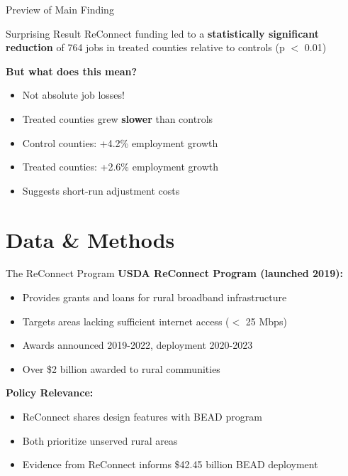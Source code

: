 \documentclass[aspectratio=169]{beamer}
\begin{document}
\begin{frame}{Preview of Main Finding}
\begin{alertblock}{Surprising Result}
ReConnect funding led to a \textbf{statistically significant reduction} of 764 jobs in treated counties relative to controls (p $<$ 0.01)
\end{alertblock}

\vspace{0.5cm}

\textbf{But what does this mean?}
\begin{itemize}
    \item Not absolute job losses!
    \item Treated counties grew \textbf{slower} than controls
    \item Control counties: +4.2\% employment growth
    \item Treated counties: +2.6\% employment growth
    \item Suggests short-run adjustment costs
\end{itemize}
\end{frame}

\section{Data \& Methods}

\begin{frame}{The ReConnect Program}
\textbf{USDA ReConnect Program (launched 2019):}
\begin{itemize}
    \item Provides grants and loans for rural broadband infrastructure
    \item Targets areas lacking sufficient internet access ($<$ 25 Mbps)
    \item Awards announced 2019-2022, deployment 2020-2023
    \item Over \$2 billion awarded to rural communities
\end{itemize}



\vspace{0.3cm}

\textbf{Policy Relevance:}
\begin{itemize}
    \item ReConnect shares design features with BEAD program
    \item Both prioritize unserved rural areas
    \item Evidence from ReConnect informs \$42.45 billion BEAD deployment
\end{itemize}
\end{frame}
\end{document}
